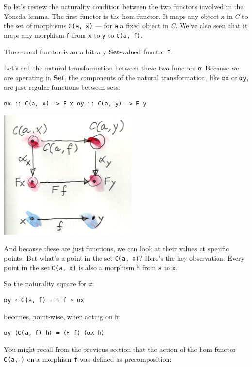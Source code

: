 So let's review the naturality condition between the two functors
involved in the Yoneda lemma. The first functor is the hom-functor. It
maps any object \texttt{x} in \emph{C} to the set of morphisms
\texttt{C(a,\ x)} --- for \texttt{a} a fixed object in \emph{C}. We've
also seen that it maps any morphism \texttt{f} from \texttt{x} to
\texttt{y} to \texttt{C(a,\ f)}.

The second functor is an arbitrary \textbf{Set}-valued functor
\texttt{F}.

Let's call the natural transformation between these two functors
\texttt{α}. Because we are operating in \textbf{Set}, the components of
the natural transformation, like \texttt{αx} or \texttt{αy}, are just
regular functions between sets:

\begin{verbatim}
αx :: C(a, x) -> F x αy :: C(a, y) -> F y
\end{verbatim}

\includegraphics[width=2.73958in]{images/yoneda1.png}

And because these are just functions, we can look at their values at
specific points. But what's a point in the set \texttt{C(a,\ x)}? Here's
the key observation: Every point in the set \texttt{C(a,\ x)} is also a
morphism \texttt{h} from \texttt{a} to \texttt{x}.

So the naturality square for \texttt{α}:

\begin{verbatim}
αy ∘ C(a, f) = F f ∘ αx
\end{verbatim}

becomes, point-wise, when acting on \texttt{h}:

\begin{verbatim}
αy (C(a, f) h) = (F f) (αx h)
\end{verbatim}

You might recall from the previous section that the action of the
hom-functor \texttt{C(a,-)} on a morphism \texttt{f} was defined as
precomposition:

